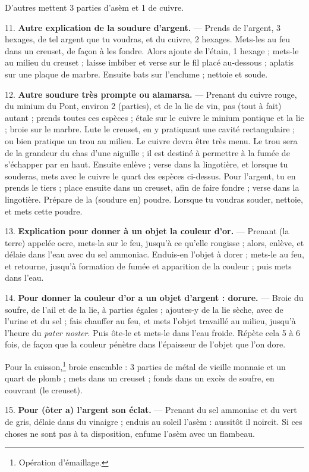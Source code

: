 \documentclass[a4paper, 11pt, oneside, polutonikogreek, french]{article}
\begin{document}
D'autres mettent 3 parties d'asèm et 1 de cuivre.

11. \textbf{Autre explication de la soudure d'argent.} --- Prends de l'argent, 3 hexages, de tel argent que tu voudras, et du cuivre, 2 hexages. Mets-les au feu dans un creuset, de façon à les fondre. Alors ajoute de l'étain, 1 hexage ; mets-le au milieu du creuset ; laisse imbiber et verse sur le fil placé au-dessous ; aplatis sur une plaque de marbre. Ensuite bats sur l'enclume ; nettoie et soude.

12. \textbf{Autre soudure très prompte ou alamarsa.} --- Prenant du cuivre rouge, du minium du Pont, environ 2 (parties), et de la lie de vin, pas (tout à fait) autant ; prends toutes ces espèces ; étale sur le cuivre le minium pontique et la lie ; broie sur le marbre. Lute le creuset, en y pratiquant une cavité rectangulaire ; ou bien pratique un trou au milieu. Le cuivre devra être très menu. Le trou sera de la grandeur du chas d'une aiguille ; il est destiné à permettre à la fumée de s'échapper par en haut. Ensuite enlève ; verse dans la lingotière, et lorsque tu souderas, mets avec le cuivre le quart des espèces ci-dessus. Pour l'argent, tu en prends le tiers ; place ensuite dans un creuset, afin de faire fondre ; verse dans la lingotière. Prépare de la (soudure en) poudre. Lorsque tu voudras souder, nettoie, et mets cette poudre.

13. \textbf{Explication pour donner à un objet la couleur d'or.} --- Prenant (la terre) appelée ocre, mets-la sur le feu, jusqu'à ce qu'elle rougisse ; alors, enlève, et délaie dans l'eau avec du sel ammoniac. Enduis-en l'objet à dorer ; mets-le au feu, et retourne, jusqu'à formation de fumée et apparition de la couleur ; puis mets dans l'eau.

14. \textbf{Pour donner la couleur d'or a un objet d'argent : dorure.} --- Broie du soufre, de l'ail et de la lie, à parties égales ; ajoutes-y de la lie sèche, avec de l'urine et du sel ; fais chauffer au feu, et mets l'objet travaillé au milieu, jusqu'à l'heure du \emph{pater noster}. Puis ôte-le et mets-le dans l'eau froide. Répète cela 5 à 6 fois, de façon que la couleur pénètre dans l'épaisseur de l'objet que l'on dore.

Pour la cuisson,\footnote{Opération d'émaillage.} broie ensemble : 3 parties de métal de vieille monnaie et un quart de plomb ; mets dans un creuset ; fonds dans un excès de soufre, en couvrant (le creuset).

15. \textbf{Pour (ôter a) l'argent son éclat.} --- Prenant du sel ammoniac et du vert de gris, délaie dans du vinaigre ; enduis au soleil l'asèm : aussitôt il noircit. Si ces choses ne sont pas à ta disposition, enfume l'asèm avec un flambeau.
\end{document}
